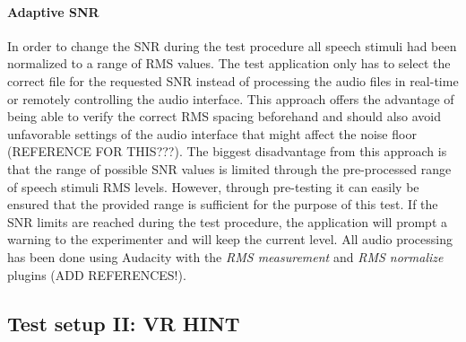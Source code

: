 \documentclass[a4paper,11pt]{article}%
\renewcommand{\\}{\vspace*{0.5\baselineskip} \newline}
\begin{document}
\paragraph{Adaptive SNR} In order to change the \ac{SNR} during the test procedure all speech stimuli had been normalized to a range of \ac{RMS} values. The test application only has to select the correct file for the requested \ac{SNR} instead of processing the audio files in real-time or remotely controlling the audio interface. This approach offers the advantage of being able to verify the correct \ac{RMS} spacing beforehand and should also avoid unfavorable settings of the audio interface that might affect the noise floor (REFERENCE FOR THIS???). The biggest disadvantage from this approach is that the range of possible \ac{SNR} values is limited through the pre-processed range of speech stimuli \ac{RMS} levels. However, through pre-testing it can easily be ensured that the provided range is sufficient for the purpose of this test. If the \ac{SNR} limits are reached during the test procedure, the application will prompt a warning to the experimenter and will keep the current level.
\newline
\newline
All audio processing has been done using Audacity with the \textit{\ac{RMS} measurement} and \textit{\ac{RMS} normalize} plugins (ADD REFERENCES!).


\subsection{Test setup II: VR HINT}
\end{document}
